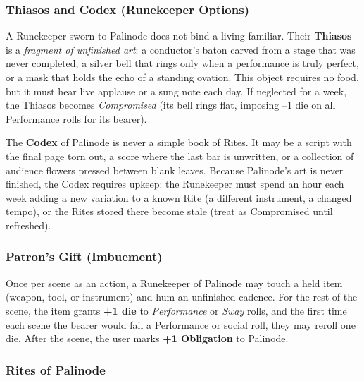 \subsubsection*{Thiasos and Codex (Runekeeper Options)}

A Runekeeper sworn to Palinode does not bind a living familiar. Their \textbf{Thiasos} is a \textit{fragment of unfinished art}: a conductor's baton carved from a stage that was never completed, a silver bell that rings only when a performance is truly perfect, or a mask that holds the echo of a standing ovation. This object requires no food, but it must hear live applause or a sung note each day. If neglected for a week, the Thiasos becomes \textit{Compromised} (its bell rings flat, imposing --1 die on all Performance rolls for its bearer).

The \textbf{Codex} of Palinode is never a simple book of Rites. It may be a script with the final page torn out, a score where the last bar is unwritten, or a collection of audience flowers pressed between blank leaves. Because Palinode's art is never finished, the Codex requires upkeep: the Runekeeper must spend an hour each week adding a new variation to a known Rite (a different instrument, a changed tempo), or the Rites stored there become stale (treat as Compromised until refreshed).

\subsubsection*{Patron's Gift (Imbuement)}

Once per scene as an action, a Runekeeper of Palinode may touch a held item (weapon, tool, or instrument) and hum an unfinished cadence. For the rest of the scene, the item grants \textbf{+1 die} to \textit{Performance} or \textit{Sway} rolls, and the first time each scene the bearer would fail a Performance or social roll, they may reroll one die. After the scene, the user marks \textbf{+1 Obligation} to Palinode.

\subsubsection*{Rites of Palinode}


